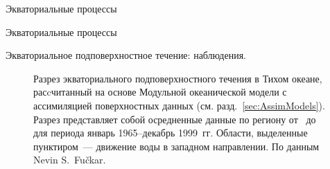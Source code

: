 \begin{chapter}{Экваториальные процессы}
\begin{section}{Экваториальные процессы}
\begin{paragraph}{Экваториальное подповерхностное течение: наблюдения.}
\begin{figure}[t!]
\caption{Разрез экваториального подповерхностного течения в Тихом
океане, расcчитанный на основе Модульной океанической модели с
ассимиляцией поверхностных данных (см. разд.~\ref{sec:AssimModels}). 
Разрез представляет собой осредненные данные по региону 
от~ до~ для периода январь 1965--декабрь 1999~гг. 
Области, выделенные пунктиром~--- движение воды в западном направлении. 
По данным Nevin S.\ Fu\v{c}kar.}
\label{fig:equatorialxsec}
\end{figure}
%
%
\end{paragraph}


\end{section}
\end{chapter}
